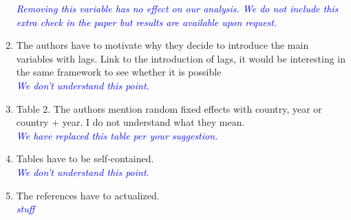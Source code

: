 \begin{enumerate}
\textcolor{blue}{\emph{
	Removing this variable has no effect on our analysis. We do not include this extra check in the paper but results are available upon request.
}}

\item The authors have to motivate why they decide to introduce the main variables with lags. Link to the introduction of lags, it would be interesting in the same framework to see whether it is possible \\

\textcolor{blue}{\emph{
	We don't understand this point.
}}

\item Table 2. The authors mention random fixed effects with country, year or country + year. I do not understand what they mean. \\

\textcolor{blue}{\emph{
	We have replaced this table per your suggestion. 
}}

\item Tables have to be self-contained. \\

\textcolor{blue}{\emph{
	We don't understand this point.
}}

\item The references have to actualized. \\

\textcolor{blue}{\emph{
	stuff
}}

\end{enumerate}